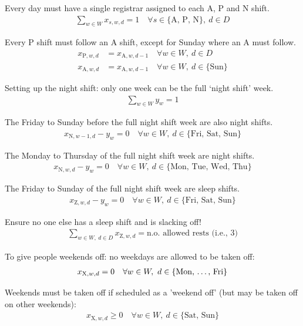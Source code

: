 \documentclass[a4paper]{article}
\begin{document}
Every day must have a single registrar assigned to each A, P and N shift.
\begin{align}
  \sum_{w\in W} x_{s, w, d} = 1 \quad\forall s\in \{\text{A, P, N}\},\ d\in D
\end{align}

Every P shift must follow an A shift, except for Sunday where an A must follow.
\begin{align}
  x_{\text{P}, w, d} &= x_{\text{A}, w, d-1} \quad\forall w\in W,\ d\in D\\
  x_{\text{A}, w, d} &= x_{\text{A}, w, d-1} \quad\forall w\in W,\ d\in \{\text{Sun}\}
\end{align}

Setting up the night shift: only one week can be the full `night shift' week.
\begin{align}
  \sum_{w\in W} y_w = 1
\end{align}

The Friday to Sunday before the full night shift week are also night shifts.
\begin{align}
  x_{\text{N}, w-1, d} - y_w = 0 \quad\forall w\in W,\ d\in \{\text{Fri, Sat, Sun}\}
\end{align}

The Monday to Thursday of the full night shift week are night shifts.
\begin{align}
  x_{\text{N}, w, d} - y_w = 0 \quad\forall w\in W,\ d\in \{\text{Mon, Tue, Wed, Thu}\}
\end{align}

The Friday to Sunday of the full night shift week are sleep shifts.
\begin{align}
  x_{\text{Z}, w, d} - y_w = 0 \quad\forall w\in W,\ d\in \{\text{Fri, Sat, Sun}\}
\end{align}

Ensure no one else has a sleep shift and is slacking off!
\begin{align}
  \sum_{w\in W,\ d\in D} x_{\text{Z}, w, d} = \text{n.o. allowed rests (i.e., 3)}
\end{align}

To give people weekends off: no weekdays are allowed to be taken off:
\begin{align}
  x_{\text{X}, w, d} = 0 \quad\forall w\in W,\ d\in \{\text{Mon, \dots, Fri}\}
\end{align}

Weekends must be taken off if scheduled as a 'weekend off' (but may be taken off on other weekends):
\begin{align}
  x_{\text{X}, w, d} \ge 0 \quad\forall w\in W,\ d\in \{\text{Sat, Sun}\}
\end{align}
\end{document}
